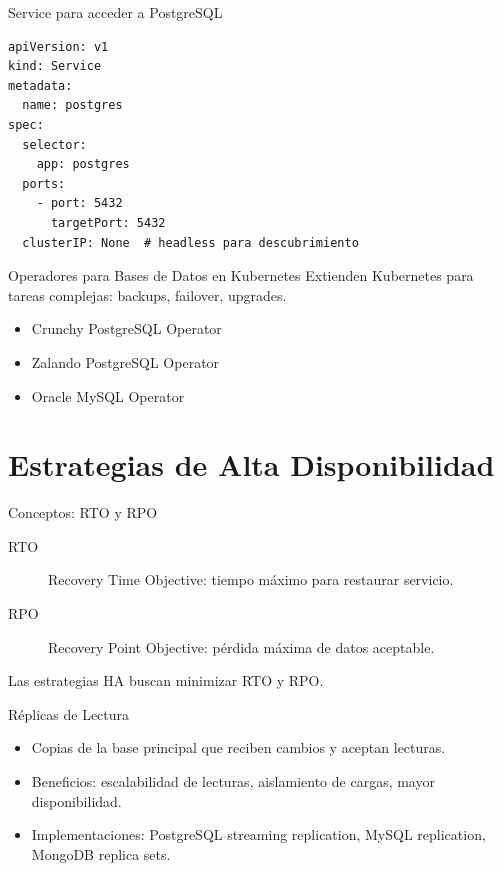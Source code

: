 \documentclass[aspectratio=169, 10pt, xcolor=table]{beamer}
\begin{document}
\begin{frame}[fragile]{Service para acceder a PostgreSQL}
    \begin{lstlisting}[style=yamlstyle]
apiVersion: v1
kind: Service
metadata:
  name: postgres
spec:
  selector:
    app: postgres
  ports:
    - port: 5432
      targetPort: 5432
  clusterIP: None  # headless para descubrimiento
    \end{lstlisting}
\end{frame}

\begin{frame}{Operadores para Bases de Datos en Kubernetes}
    Extienden Kubernetes para tareas complejas: backups, failover, upgrades.
    \begin{itemize}
        \item Crunchy PostgreSQL Operator
        \item Zalando PostgreSQL Operator
        \item Oracle MySQL Operator
    \end{itemize}
\end{frame}

\section{Estrategias de Alta Disponibilidad}

\begin{frame}{Conceptos: RTO y RPO}
    \begin{description}
        \item[RTO] Recovery Time Objective: tiempo máximo para restaurar servicio.
        \item[RPO] Recovery Point Objective: pérdida máxima de datos aceptable.
    \end{description}
    Las estrategias HA buscan minimizar RTO y RPO.
\end{frame}

\begin{frame}{Réplicas de Lectura}
    \begin{itemize}
        \item Copias de la base principal que reciben cambios y aceptan lecturas.
        \item Beneficios: escalabilidad de lecturas, aislamiento de cargas, mayor disponibilidad.
        \item Implementaciones: PostgreSQL streaming replication, MySQL replication, MongoDB replica sets.
    \end{itemize}
\end{frame}
\end{document}
